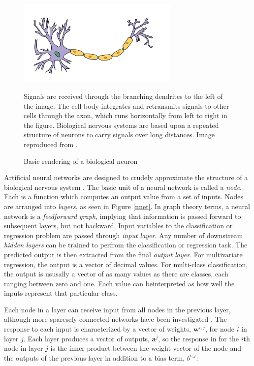 \begin{figure}
  \begin{center}
    \includegraphics[width=0.7\textwidth]{figures/figures/neuron.png}
  \end{center}
  \caption{Basic rendering of a biological neuron}{Signals are received through the branching dendrites to the left of the image.  The cell body integrates and retransmits signals to other cells through the axon, which runs horizontally from left to right in the figure.  Biological nervous systems are based upon a repeated structure of neurons to carry signals over long distances.
  Image reproduced from \cite{neuronWikiCitation}.}

  \label{neuron}
\end{figure}

Artificial neural networks are designed to crudely approximate the structure of a biological nervous system \cite{reed1999neural}.  The basic unit of a neural network is called a \textit{node}.  Each is a function which computes an output value from a set of inputs.  Nodes are arranged into \textit{layers}, as seen in Figure \ref{nnet}.  In graph theory terms, a neural network is a \textit{feedforward graph}, implying that information is passed forward to subsequent layers, but not backward.  Input variables to the classification or regression problem are passed through \textit{input layer}.  Any number of downstream \textit{hidden layers} can be trained to perfrom the classification or regression task.  The predicted output is then extracted from the final \textit{output layer}.  For multivariate regression, the output is a vector of decimal values.  For multi-class classification, the output is ususally a vector of as many values as there are classes, each ranging between zero and one.
Each value can beinterpreted as how well the inputs represent that particular
class.

Each node in a layer can receive input from all nodes in the previous layer, although more sparesely connected networks have been investigated
\cite{reed1999neural}.
The response to each input is characterized by a vector of weights,
$\mathbf{w}^{i,j}$, for node $i$ in layer $j$.  Each layer produces a vector of outputs, $\mathbf{a}^{j}$, so the response in for the $i$th node in layer $j$ is the inner product between the weight vector of the node and the outputs of the previous layer in addition to a bias term, $b^{i,j}$:


